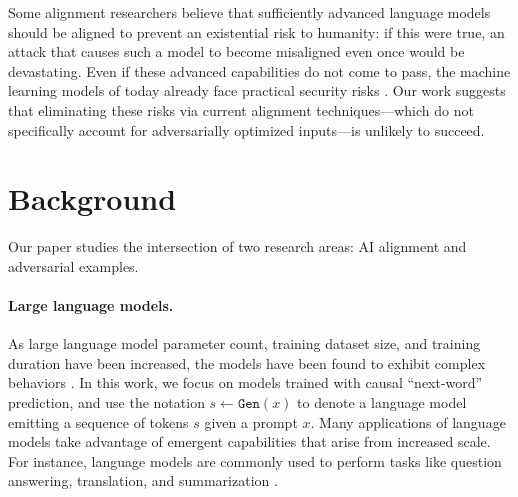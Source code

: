\documentclass{article}
\newcommand{\gen}{\texttt{Gen}}
\renewcommand{\cite}{\citep}
\begin{document}
Some alignment researchers \cite{hc,bucknall2022current,ngo2022alignment,carlsmith2022power} believe that sufficiently advanced
language models should be aligned to prevent an existential risk \cite{bostrom2013existential} to humanity:
if this were true, an attack that causes such a model to become
misaligned even once would be devastating.
%
Even if these advanced capabilities do not come to pass,
the machine learning models of today already face practical security risks \cite{brundage2018malicious, greshake2023more}.
Our work suggests that eliminating these risks via current alignment techniques---which do not specifically account for  adversarially optimized inputs---is unlikely to succeed.


\newpage
\section{Background}

Our paper studies the intersection of two research areas:
AI alignment and adversarial examples.

\label{sec:background_align}
\paragraph{Large language models.~}
As large language model parameter count, training dataset size, and training duration have been increased, the models have been found to exhibit complex behaviors \citep{brown2020language, wei2022emergent, ganguli2022surprise}.
%
In this work, we focus on models trained with causal ``next-word'' prediction,
and use the notation $s \gets \gen(x)$ to denote a language model emitting a 
sequence of tokens $s$ given a prompt $x$.
Many applications of language models take advantage of emergent capabilities that arise from increased scale.
For instance, language models are commonly used to perform tasks like question answering, translation, and summarization \cite{chowdhery2022palm, rae2022scaling,anil2023palm,liang2022holistic, goyal2022news}.

\end{document}
